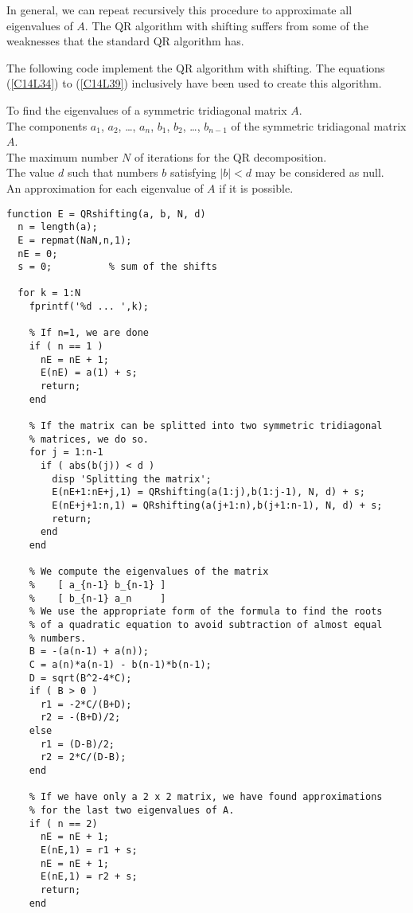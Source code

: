 In general, we can repeat recursively this procedure to approximate all
eigenvalues of $A$.  The QR algorithm with shifting suffers from some of the
weaknesses that the standard QR algorithm has.

The following code implement the QR algorithm with shifting.  The
equations (\ref{C14L34}) to (\ref{C14L39}) inclusively have been used to
create this algorithm.

\begin{code}
To find the eigenvalues of a symmetric tridiagonal matrix $A$.\\
 The components $a_1$, $a_2$, \ldots, $a_n$, $b_1$, $b_2$,
\ldots, $b_{n-1}$ of the symmetric tridiagonal matrix $A$. \\
The maximum number $N$ of iterations for the QR decomposition. \\
The value $d$ such that numbers $b$ satisfying $|b|< d$ may be
considered as null.\\
 An approximation for each eigenvalue of $A$ if it is
possible.
\small
\begin{verbatim}
function E = QRshifting(a, b, N, d)
  n = length(a);
  E = repmat(NaN,n,1);
  nE = 0;
  s = 0;          % sum of the shifts

  for k = 1:N
    fprintf('%d ... ',k);

    % If n=1, we are done
    if ( n == 1 )
      nE = nE + 1;
      E(nE) = a(1) + s;
      return;
    end 

    % If the matrix can be splitted into two symmetric tridiagonal
    % matrices, we do so.
    for j = 1:n-1
      if ( abs(b(j)) < d )
        disp 'Splitting the matrix';
        E(nE+1:nE+j,1) = QRshifting(a(1:j),b(1:j-1), N, d) + s;
        E(nE+j+1:n,1) = QRshifting(a(j+1:n),b(j+1:n-1), N, d) + s;
        return;
      end
    end

    % We compute the eigenvalues of the matrix
    %    [ a_{n-1} b_{n-1} ]
    %    [ b_{n-1} a_n     ]
    % We use the appropriate form of the formula to find the roots
    % of a quadratic equation to avoid subtraction of almost equal
    % numbers.
    B = -(a(n-1) + a(n));
    C = a(n)*a(n-1) - b(n-1)*b(n-1);
    D = sqrt(B^2-4*C);
    if ( B > 0 )
      r1 = -2*C/(B+D);
      r2 = -(B+D)/2;
    else
      r1 = (D-B)/2;
      r2 = 2*C/(D-B);
    end

    % If we have only a 2 x 2 matrix, we have found approximations
    % for the last two eigenvalues of A.
    if ( n == 2)
      nE = nE + 1;
      E(nE,1) = r1 + s;
      nE = nE + 1;
      E(nE,1) = r2 + s;
      return;
    end


\end{verbatim}
\end{code}
